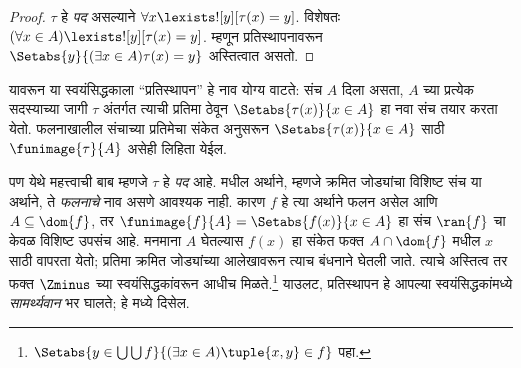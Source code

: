 \documentclass[../../../include/open-logic-section]{subfiles}
\begin{document}
\begin{proof}
$\tau$ हे \emph{पद} असल्याने $\forall x \lexists![y][\tau(x) = y]$. विशेषतः $(\forall x \in A)\lexists![y][\tau(x) = y]$. म्हणून प्रतिस्थापनावरून $\Setabs{y}{(\exists x \in A)\tau(x) = y}$ अस्तित्वात असतो.
\end{proof}
\noindent
यावरून या स्वयंसिद्धकाला ``प्रतिस्थापन'' हे नाव योग्य वाटते: संच $A$ दिला असता, $A$ च्या प्रत्येक सदस्याच्या जागी $\tau$ अंतर्गत त्याची प्रतिमा ठेवून $\Setabs{\tau(x)}{x \in A}$ हा नवा संच तयार करता येतो. फलनाखालील संचाच्या प्रतिमेचा संकेत अनुसरून $\Setabs{\tau(x)}{x \in A}$ साठी $\funimage{\tau}{A}$ असेही लिहिता येईल.

पण येथे महत्त्वाची बाब म्हणजे $\tau$ हे \emph{पद} आहे.  मधील अर्थाने, म्हणजे क्रमित जोड्यांचा विशिष्ट संच या अर्थाने, ते \emph{फलनाचे} नाव असणे आवश्यक नाही. कारण $f$ हे त्या अर्थाने फलन असेल आणि $A\subseteq\dom{f}$,
तर $\funimage{f}{A}=\Setabs{f(x)}{x\in A}$ हा संच $\ran{f}$ चा
केवळ विशिष्ट उपसंच आहे. मनमाना $A$ घेतल्यास $f(x)$ हा संकेत
फक्त $A\cap\dom{f}$ मधील $x$ साठी वापरता येतो; प्रतिमा
क्रमित जोड्यांच्या आलेखावरून त्याच बंधनाने घेतली जाते. त्याचे अस्तित्व तर फक्त $\Zminus$ च्या स्वयंसिद्धकांवरून आधीच मिळते.\footnote{$\Setabs{y\in\bigcup\bigcup f}{(\exists x\in A)\tuple{x,y}\in f}$ पहा.} याउलट, प्रतिस्थापन हे आपल्या स्वयंसिद्धकांमध्ये \emph{सामर्थ्यवान} भर घालते; हे  मध्ये दिसेल.
\end{document}
